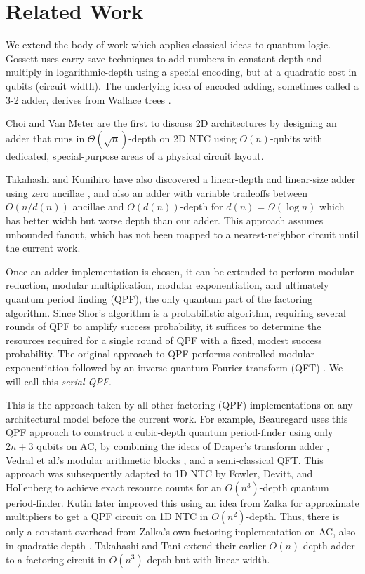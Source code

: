 \section{Related Work}
\label{sec:related}

We extend the body of work which applies classical ideas to
quantum logic. Gossett \cite{Gossett1998} uses carry-save techniques to add
numbers in constant-depth and multiply in logarithmic-depth
using a special encoding, but at a quadratic
cost in qubits (circuit width). The underlying idea of encoded adding, sometimes
called a 3-2 adder, derives from Wallace trees \cite{Wallace1964}.

Choi and Van Meter are the first to discuss 2D architectures by designing an
adder that runs in $\Theta(\sqrt{n})$-depth on \textsc{2D NTC} \cite{Choi2010}
using $O(n)$-qubits with dedicated, special-purpose areas of a physical
circuit layout.

Takahashi and Kunihiro have also discovered a linear-depth
and linear-size adder using zero ancillae \cite{Takahashi2005}, and also
an adder with variable tradeoffs between $O(n/d(n))$ ancillae and
$O(d(n))$-depth for $d(n) = \Omega(\log n)$ \cite{Takahashi2009} which has
better width but worse depth than our adder. This approach assumes unbounded
fanout, which has not been mapped to a
nearest-neighbor circuit until the current work.

Once an adder implementation is chosen, it can be extended to perform
modular reduction, modular multiplication, modular
exponentiation, and ultimately
quantum period finding (QPF), the only quantum part of the factoring algorithm.
Since Shor's algorithm is a probabilistic algorithm, requiring several rounds of 
QPF to amplify success probability, it suffices to determine the resources
required for a single round of QPF with a fixed, modest success probability.
The original approach to QPF performs controlled
modular exponentiation followed by an inverse quantum Fourier transform
(QFT) \cite{Nielsen2000}. We will call this \emph{serial QPF}.

This is the approach taken by all other factoring (QPF)
implementations on any architectural model before the current work.
For example, Beauregard \cite{Beauregard2002} uses this QPF approach
to construct
a cubic-depth quantum period-finder using only $2n+3$ qubits on AC,
by combining the ideas of Draper's transform adder \cite{Draper2000},
Vedral et al.'s modular arithmetic blocks \cite{Vedral1996}, and a
semi-classical QFT.
This approach was subsequently adapted to \textsc{1D NTC} by Fowler, Devitt,
and Hollenberg
\cite{Fowler2004} to achieve exact resource counts for an $O(n^3)$-depth
quantum period-finder. Kutin \cite{Kutin2006} later improved this using
an idea from Zalka for approximate multipliers to get a QPF circuit on
\textsc{1D NTC}
in $O(n^2)$-depth. Thus, there is only a constant overhead from
Zalka's own factoring implementation on \textsc{AC}, also in quadratic depth
\cite{Zalka1998}.
Takahashi and Tani extend their earlier $O(n)$-depth adder to a factoring
circuit in $O(n^3)$-depth but with linear width.

